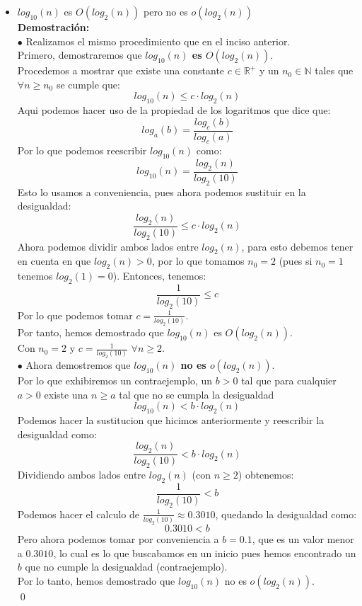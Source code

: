 \documentclass[12pt]{article}
\begin{document}
\begin{itemize}
\begin{itemize}
            \item $log_{10}(n)$ es $O(log_2(n))$ pero no es $o(log_2(n))$\\
            \textbf{Demostración:}\\
            $\bullet$ Realizamos el mismo procedimiento que en el inciso anterior.\\
            Primero, demostraremos que \textbf{$log_{10}(n)$ es $O(log_2(n))$}.\\
            Procedemos a mostrar que existe una constante $c \in \mathbb{R^{+}}$ y un $n_0 \in \mathbb{N}$ tales que $\forall n \geq n_0$ se cumple que:
            \[
            log_{10}(n) \leq c \cdot log_2(n)
            \]
            Aqui podemos hacer uso de la propiedad de los logaritmos que dice que:
            \[
            log_a(b) = \frac{log_c(b)}{log_c(a)}
            \]
            Por lo que podemos reescribir $log_{10}(n)$ como:
            \[
            log_{10}(n) = \frac{log_2(n)}{log_2(10)}
            \]
            Esto lo usamos a conveniencia, pues ahora podemos sustituir en la desigualdad:
            \[
            \frac{log_2(n)}{log_2(10)} \leq c \cdot log_2(n)
            \]
            Ahora podemos dividir ambos lados entre $log_2(n)$, para esto debemos tener en cuenta en que $log_2(n) > 0$, por lo que tomamos $n_0 = 2$ (pues si $n_0 = 1$ tenemos $log_2(1) = 0$). Entonces, tenemos:
            \[
            \frac{1}{log_2(10)} \leq c
            \]
            Por lo que podemos tomar $c = \frac{1}{log_2(10)}$.\\
            Por tanto, hemos demostrado que $log_{10}(n)$ es $O(log_2(n))$.\\
            Con $n_0 = 2$ y $c = \frac{1}{log_2(10)}$ $\forall n \geq 2$.\\
            

            $\bullet$ Ahora demostremos que \textbf{$log_{10}(n)$ no es $o(log_2(n))$}.\\
            Por lo que exhibiremos un contraejemplo, un $b > 0$ tal que para cualquier $a > 0$ existe una $n \geq a$ tal que no se cumpla la desigualdad
            \[
            log_{10}(n) < b \cdot log_2(n)
            \]
            Podemos hacer la sustitucion que hicimos anteriormente y reescribir la desigualdad como:
            \[
            \frac{log_2(n)}{log_2(10)} < b \cdot log_2(n)
            \]
            Dividiendo ambos lados entre $log_2(n)$ (con $n \geq 2$) obtenemos:
            \[
            \frac{1}{log_2(10)} < b
            \]
            Podemos hacer el calculo de $\frac{1}{log_2(10)} \approx 0.3010$, quedando la desigualdad como:
            \[
            0.3010 < b
            \]
            Pero ahora podemos tomar por conveniencia a $b = 0.1$, que es un valor menor a $0.3010$, lo cual es lo que buscabamos en un inicio pues hemos encontrado un $b$ que no cumple la desigualdad (contraejemplo).\\
            Por lo tanto, hemos demostrado que $log_{10}(n)$ no es $o(log_2(n))$.\\
            \qed





\end{itemize}
\end{itemize}
\end{document}
